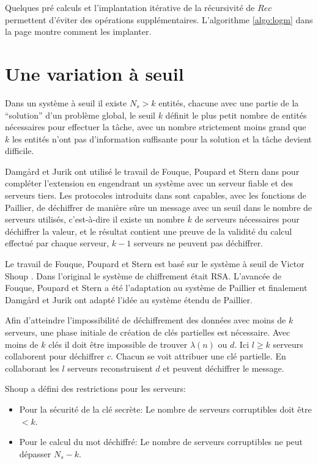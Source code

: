	
	Quelques pré calculs et l'implantation itérative de la récursivité de $Rec$ permettent d'éviter des opérations supplémentaires. 
	L'algorithme \ref{algo:logm} dans la page \pageref{algo:logm} montre comment les implanter.


	\section{Une variation à seuil}

	Dans un système à seuil il existe $N_s > k$ entités, chacune avec une partie de 
	la ``solution'' d'un problème global, le seuil $k$ définit le plus petit nombre de entités nécessaires 
	pour effectuer la tâche, avec un nombre strictement moins grand que $k$ les entités n'ont pas d'information suffisante 
	pour la solution et la tâche devient difficile. 

	Damgård et Jurik ont utilisé le travail de Fouque, Poupard et Stern dans \cite{Fouque00sharingdecryption} pour compléter l'extension 
	en engendrant un système avec un serveur fiable et des serveurs tiers. Les protocoles introduits dans \cite{Fouque00sharingdecryption} sont
	capables, avec les fonctions de Paillier, de déchiffrer de manière sûre un message 
	avec un seuil dans le nombre de serveurs utilisés, c'est-à-dire il existe un nombre $k$ de serveurs nécessaires
	pour déchiffrer la valeur, et le résultat contient une preuve de la validité du calcul effectué par chaque serveur, 
	$k-1$ serveurs ne peuvent pas déchiffrer.

	Le travail de Fouque, Poupard et Stern est basé sur le système à seuil de Victor Shoup \cite{Shoup99practicalthreshold}. Dans 
	l'original le système de chiffrement était RSA. L'avan\-cée de Fouque, Poupard et Stern a été l'adaptation au système de Paillier et 
	finalement Damgård et Jurik ont adapté l'idée au système étendu de Paillier.

	Afin d'atteindre l'impossibilité de déchiffrement des données avec moins de $k$ serveurs, une phase initiale de création de clés 
	partielles est nécessaire. Avec moins de $k$ clés il doit être impossible de trouver $\lambda(n)$ ou $d$. Ici $l\geq k$ serveurs 
	collaborent pour déchiffrer $c$. Chacun se voit attribuer une clé partielle. En collaborant les $l$ serveurs reconstruisent $d$ et peuvent 
	déchiffrer le message.
	
	Shoup a défini des restrictions pour les serveurs:

	\begin{itemize}  \label{item:restr}
		\item Pour la sécurité de la clé secrète: Le nombre de serveurs corruptibles doit être $<k$.
		\item Pour le calcul du mot déchiffré: Le nombre de serveurs corruptibles ne peut dépasser $N_s-k$.
	\end{itemize}


